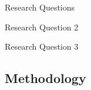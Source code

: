 \documentclass{beamer}
\begin{document}
\def\rqb{\begin{alertblock}{Research Question 2}
        \rqbtext{}
    \end{alertblock}
}

\def\rqc{\begin{alertblock}{Research Question 3}
        \rqctext{}
    \end{alertblock}
}

\begin{frame}{Research Questions}
    \rqa{} \vspace*{\fill}
    \rqb{} \vspace*{\fill}
    \rqc{} \vspace*{\fill}
    \vspace{0.2cm}
\end{frame}

\subsection{Methodology}


\end{document}
